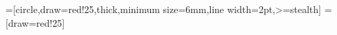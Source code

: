\newcommand{\cpot}[1]{{\phi\left( #1\right)}}
\newcommand{\cpots}[1]{{\phi^*\left( #1\right)}}
\newcommand{\cpotss}[1]{{\phi^{**}\left( #1\right)}}
\newcommand{\cpotp}[1]{{\hat{\phi}\left( #1\right)}}
\newcommand{\minus}{\backslash}
\newcommand{\union}{\cup}
\newcommand{\dirichlet}[2]{{\rm Dirichlet}\br{#1|#2}}
\newcommand{\jpai}{pa(i)}
\newcommand{\insect}{\cap}
\newcommand{\bueq}{\[}
\newcommand{\eueq}{\]}
\newcommand{\bnet}{belief network\xspace}
\newcommand{\minv}[1]{{\boldsymbol{{\rm #1}}^{-1}}}
\newcommand{\bnets}{belief networks\xspace}
\newcommand{\drawsep}[4]{
\node[sep] (#1) at ($(#2)!0.5!(#3)$) {#4};
\draw(#1)--(#2);\draw(#1)--(#3);}
=[circle,draw=red!25,thick,minimum size=6mm,line width=2pt,>=stealth]  %
=[draw=red!25]  %
\newcommand{\vdim}[1]{\textrm{dim}\br{#1}}
\newcommand{\dimmodel}{K}
\newcommand{\btz}{\begin{tikzpicture}}
\newcommand{\etz}{\end{tikzpicture}}
\newcommand{\ind}[1]{\mathbb{I}\sq{#1}}
\newcommand{\trans}{^{\textsf{T}}}
\newcommand{\nin}{\not\in}
\newcommand{\boldDelta}{\boldsymbol{\Delta}}
\newcommand{\bolddelta}{\boldsymbol{\delta}}
\newcommand{\boldmu}{\boldsymbol{\mu}}
\newcommand{\boldeta}{\boldsymbol{\eta}}
\newcommand{\boldnu}{\boldsymbol{\nu}}
\newcommand{\boldalpha}{\boldsymbol{\alpha}}
\newcommand{\boldbeta}{\boldsymbol{\beta}}
\newcommand{\boldepsilon}{\boldsymbol{\epsilon}}
\newcommand{\boldSigma}{\boldsymbol{\Sigma}}
\newcommand{\boldsigma}{\boldsymbol{\sigma}}
\newcommand{\boldtau}{\boldsymbol{\tau}}
\newcommand{\boldlambda}{\boldsymbol{\lambda}}
\newcommand{\boldLambda}{\boldsymbol{\Lambda}}
\newcommand{\boldpsi}{\boldsymbol{\psi}}
\newcommand{\boldxi}{\boldsymbol{\xi}}
\newcommand{\boldPsi}{\boldsymbol{\Psi}}
\newcommand{\boldphi}{\boldsymbol{\phi}}
\newcommand{\boldPhi}{\boldsymbol{\Phi}}
\newcommand{\boldtheta}{\boldsymbol{\theta}}
\newcommand{\boldTheta}{\boldsymbol{\Theta}}
\newcommand{\boldgamma}{\boldsymbol{\gamma}}
\newcommand{\boldpi}{\boldsymbol{\pi}}

